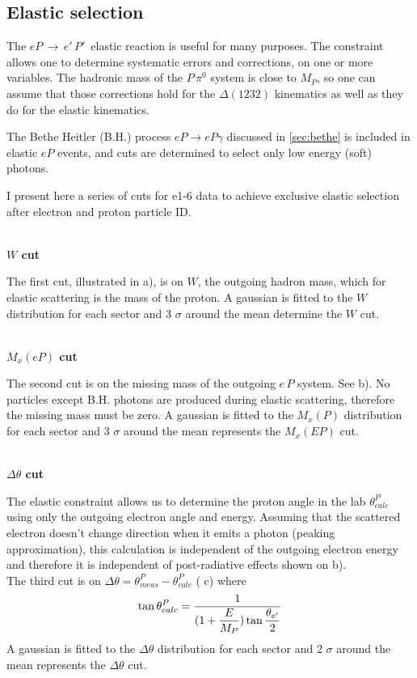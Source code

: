 \subsection{Elastic selection} 
\label{sec:elastic_selection}
The $e P \,\rightarrow\, e' \,P'\,$ elastic reaction is useful for many purposes. 
The constraint allows one to determine systematic errors and corrections,
on one or more variables.
The hadronic mass of the $P\, \pi^0$ system is close to $M_P$, so 
one can assume that those corrections hold for the $\Delta(1232)$ kinematics as well
as they do for the elastic kinematics.

The Bethe Heitler (B.H.) process $eP\rightarrow eP\gamma$ discussed in \ref{sec:bethe}
is included in elastic $eP$ events, and cuts are determined to select
only low energy (soft) photons.

I present here a series of cuts for e1-6 data to achieve exclusive 
elastic selection after electron and proton particle ID.

\hfill\\

{\bf\boldmath $W$ cut}

The first cut, illustrated in  a),  is on $W$, the outgoing hadron mass, which for elastic scattering
is the mass of the proton. 
A gaussian is fitted to the $W$ distribution for each sector and 3 $\sigma$ around the mean
determine the $W$ cut. 

\hfill\\

{\bf\boldmath $M_x(eP)$ cut}

The second cut is on the missing mass of the outgoing $e\,P$ system. See  b). 
No particles except B.H. photons are produced during elastic scattering, 
therefore the missing mass must be zero.
A gaussian is fitted to the $M_x(P)$ distribution for each sector and 3 $\sigma$ around the mean
represents the $M_x(EP)$ cut.

\hfill\\

{\bf\boldmath $\Delta \theta$ cut}


The elastic constraint allows us to determine the proton angle in the lab $\theta^P_{calc}$
using only the outgoing electron angle and energy.
Assuming that the scattered electron doesn't change direction when it emits a photon (peaking approximation),
this calculation is independent of the outgoing electron energy and therefore it is independent of
 post-radiative effects shown on  b). \\
The third cut is on $\Delta\theta = \theta^P_{meas} - \theta^P_{calc}$ ( c) where
$$
 \tan\theta^P_{calc} =  \frac{\displaystyle 1}{\displaystyle (1+\frac{\displaystyle E}{\displaystyle M_P})\tan\frac{\displaystyle \theta_{e'}}{\displaystyle 2}}
$$
A gaussian is fitted to the $\Delta\theta$ distribution for each sector and 2 $\sigma$ around the mean
represents the $\Delta\theta$ cut.

